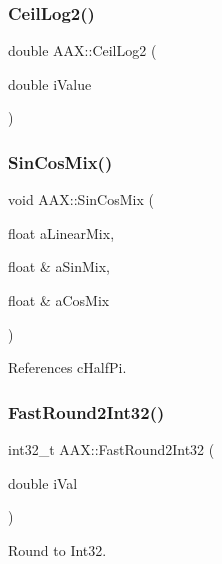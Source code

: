 \subsubsection{\texorpdfstring{CeilLog2()}{CeilLog2()}}
{\footnotesize\ttfamily double A\+A\+X\+::\+Ceil\+Log2 (\begin{DoxyParamCaption}\item[{double}]{i\+Value }\end{DoxyParamCaption})\hspace{0.3cm}{\ttfamily [inline]}}

\mbox{\label{a00852_a3826233eb62186c03bb093f1031ca8f4}} 
\subsubsection{\texorpdfstring{SinCosMix()}{SinCosMix()}}
{\footnotesize\ttfamily void A\+A\+X\+::\+Sin\+Cos\+Mix (\begin{DoxyParamCaption}\item[{float}]{a\+Linear\+Mix,  }\item[{float \&}]{a\+Sin\+Mix,  }\item[{float \&}]{a\+Cos\+Mix }\end{DoxyParamCaption})\hspace{0.3cm}{\ttfamily [inline]}}



References c\+Half\+Pi.

\mbox{\label{a00852_af0bbeabd87aa74be4ecca4f767aedc41}} 
\subsubsection{\texorpdfstring{FastRound2Int32()}{FastRound2Int32()}\hspace{0.1cm}{\footnotesize\ttfamily [1/2]}}
{\footnotesize\ttfamily int32\+\_\+t A\+A\+X\+::\+Fast\+Round2\+Int32 (\begin{DoxyParamCaption}\item[{double}]{i\+Val }\end{DoxyParamCaption})\hspace{0.3cm}{\ttfamily [inline]}}



Round to Int32. 


